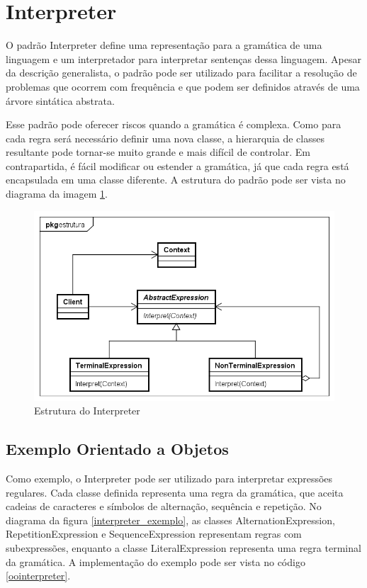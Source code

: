 \section{Interpreter}

O padrão Interpreter define uma representação para 
a gramática de uma linguagem e um interpretador para 
interpretar sentenças dessa linguagem. Apesar da 
descrição generalista, o padrão 
pode ser utilizado para facilitar a resolução de 
problemas que ocorrem com frequência e que podem 
ser definidos através de uma árvore sintática 
abstrata.

Esse padrão pode oferecer riscos quando a gramática 
é complexa. Como para cada regra será necessário 
definir uma nova classe, a hierarquia de classes 
resultante pode tornar-se muito grande e mais 
difícil de controlar. Em contrapartida, é 
fácil modificar ou estender a gramática, já 
que cada regra está encapsulada em uma classe 
diferente. A estrutura do padrão pode ser vista 
no diagrama da imagem \ref{interpreter_struct}.

\begin{figure}[htb]
	\caption{\label{interpreter_struct}Estrutura do Interpreter}
	\begin{center}
	    \includegraphics[scale=0.5]{5_padroes-contexto-funcional/5.3_comportamentais/5.3.03_interpreter/Interpreter_struct.png}
	\end{center}
\end{figure}

\subsection*{Exemplo Orientado a Objetos}

Como exemplo, o Interpreter pode ser utilizado para 
interpretar expressões regulares. Cada classe definida 
representa uma regra da gramática, que aceita cadeias de 
caracteres e símbolos de alternação, sequência e 
repetição. No diagrama da figura \ref{interpreter_exemplo}, 
as classes AlternationExpression, RepetitionExpression e 
SequenceExpression representam regras com subexpressões, 
enquanto a classe LiteralExpression representa uma 
regra terminal da gramática. A implementação do exemplo 
pode ser vista no código \ref{oointerpreter}.

